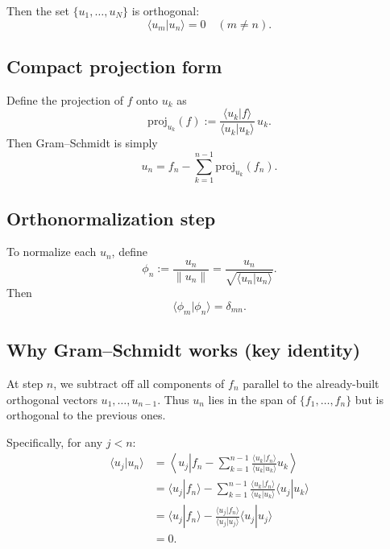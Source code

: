 Then the set $\{u_1,\dots,u_N\}$ is orthogonal:
\[
\langle u_m|u_n\rangle = 0 \quad (m\neq n).
\]

\subsection{Compact projection form}
Define the projection of $f$ onto $u_k$ as
\begin{equation}
\mathrm{proj}_{u_k}(f) :=
\frac{\langle u_k|f\rangle}{\langle u_k|u_k\rangle}\,u_k.
\end{equation}
Then Gram--Schmidt is simply
\begin{equation}
u_n = f_n - \sum_{k=1}^{n-1}\mathrm{proj}_{u_k}(f_n).
\end{equation}


\subsection{Orthonormalization step}
To normalize each $u_n$, define
\begin{equation}
\phi_n := \frac{u_n}{\|u_n\|} =
\frac{u_n}{\sqrt{\langle u_n|u_n\rangle}}.
\end{equation}
Then
\[
\langle \phi_m|\phi_n\rangle = \delta_{mn}.
\]


\subsection{Why Gram--Schmidt works (key identity)}
At step $n$, we subtract off all components of $f_n$ parallel to the already-built
orthogonal vectors $u_1,\dots,u_{n-1}$.
Thus $u_n$ lies in the span of $\{f_1,\dots,f_n\}$ but is orthogonal to the previous ones.

Specifically, for any $j<n$:
\begin{align}
\langle u_j|u_n\rangle
&= \left\langle u_j\left|f_n - \sum_{k=1}^{n-1}
\frac{\langle u_k|f_n\rangle}{\langle u_k|u_k\rangle}u_k\right.\right\rangle\\
&= \langle u_j|f_n\rangle - \sum_{k=1}^{n-1}
\frac{\langle u_k|f_n\rangle}{\langle u_k|u_k\rangle}\langle u_j|u_k\rangle\\
&= \langle u_j|f_n\rangle
- \frac{\langle u_j|f_n\rangle}{\langle u_j|u_j\rangle}\langle u_j|u_j\rangle\\
&=0.
\end{align}

